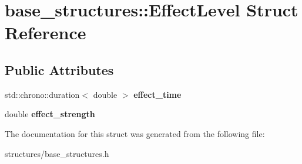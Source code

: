 \hypertarget{structbase__structures_1_1EffectLevel}{}\section{base\+\_\+structures\+:\+:Effect\+Level Struct Reference}
\label{structbase__structures_1_1EffectLevel}
\subsection*{Public Attributes}
\begin{DoxyCompactItemize}
\item 
\mbox{\label{structbase__structures_1_1EffectLevel_a85a08952f98d216f81a4b2956252a481}} 
std\+::chrono\+::duration$<$ double $>$ {\bfseries effect\+\_\+time}
\item 
\mbox{\label{structbase__structures_1_1EffectLevel_a85061fe51d99262f5255b7781fbd0046}} 
double {\bfseries effect\+\_\+strength}
\end{DoxyCompactItemize}


The documentation for this struct was generated from the following file\+:\begin{DoxyCompactItemize}
\item 
structures/base\+\_\+structures.\+h\end{DoxyCompactItemize}
